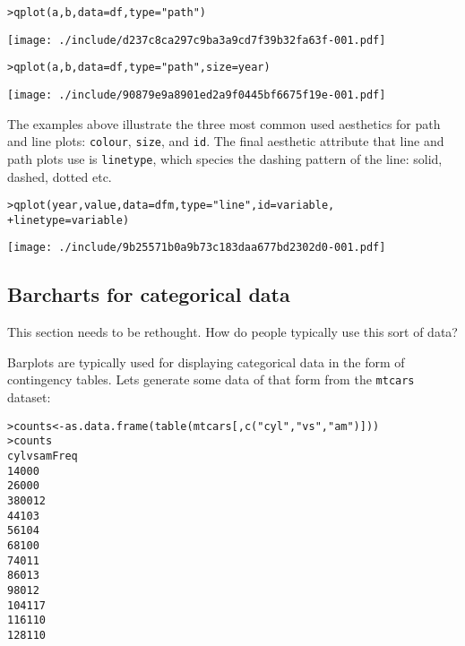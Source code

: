 \begin{alltt}
> qplot(a, b, data = df, type = "path")
\end{alltt}
\texttt{[image: ./include/d237c8ca297c9ba3a9cd7f39b32fa63f-001.pdf]}
\begin{alltt}

> qplot(a, b, data = df, type = "path", size = year)
\end{alltt}
\texttt{[image: ./include/90879e9a8901ed2a9f0445bf6675f19e-001.pdf]}
\begin{alltt}

\end{alltt}%

The examples above illustrate the three most common used aesthetics for path and line plots: {\tt colour}, {\tt size}, and {\tt id}.  The final aesthetic attribute that line and path plots use is {\tt linetype}, which species the dashing pattern of the line: solid, dashed, dotted etc.

\begin{alltt}
> qplot(year, value, data = dfm, type = "line", id = variable, 
+     linetype = variable)
\end{alltt}
\texttt{[image: ./include/9b25571b0a9b73c183daa677bd2302d0-001.pdf]}
\begin{alltt}

\end{alltt}%

\subsection{Barcharts for categorical data}\label{sub:bar_plots}

This section needs to be rethought.  How do people typically use this sort of data?

Barplots are typically used for displaying categorical data in the form of contingency tables.  Lets generate some data of that form from the {\tt mtcars} dataset:

\begin{alltt}
> counts <- as.data.frame(table(mtcars[, c("cyl", "vs", "am")]))
> counts
   cyl vs am Freq
1    4  0  0    0
2    6  0  0    0
3    8  0  0   12
4    4  1  0    3
5    6  1  0    4
6    8  1  0    0
7    4  0  1    1
8    6  0  1    3
9    8  0  1    2
10   4  1  1    7
11   6  1  1    0
12   8  1  1    0

\end{alltt}%

